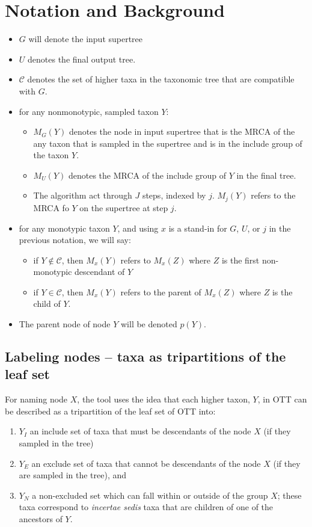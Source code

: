 \documentclass[english]{article}
\newcommand{\parent}[1]{p(#1)}
\newcommand{\tripartition}[1]{\left[{#1}_I \mid {#1}_E \updownarrow {#1}_N\right]}
\newcommand{\incsed}[0]{{\em incertae sedis}\xspace}
\begin{document}
\section{Notation and Background}
\begin{itemize}
    \item $G$ will denote the input supertree
    \item $U$  denotes the final output tree.
    \item $\mathcal{C}$ denotes the set of higher taxa in the taxonomic tree
        that are compatible with $G$.
    \item for any nonmonotypic, sampled taxon $Y$:
    \begin{itemize}
        \item $M_G(Y)$ denotes the node in input supertree that is the MRCA of
            the any taxon that is sampled in the supertree and is in the
            include group of the taxon $Y$.
        \item $M_U(Y)$ denotes the MRCA of the include group of $Y$ in the final tree.
        \item The algorithm act through $J$ steps, indexed by $j$.
            $M_j(Y)$ refers to the MRCA fo $Y$ on the supertree at step $j$.
    \end{itemize}
    \item for any monotypic taxon $Y$, and using $x$ is a stand-in for $G$, $U$, or $j$ in the previous notation, we will say:
    \begin{itemize}
        \item if $Y\notin\mathcal{C}$, then $M_x(Y)$ refers
            to $M_x(Z)$ where $Z$ is the first non-monotypic descendant of $Y$
        \item if $Y \in \mathcal{C}$, then $M_x(Y)$ refers
            to the parent of $M_x(Z)$ where $Z$ is the child of $Y$.
    \end{itemize}
    \item The parent node of node $Y$ will be denoted $\parent{Y}$.
\end{itemize}

\subsection{Labeling nodes -- taxa as tripartitions of the leaf set}
For naming node $X$, the tool uses the idea that each higher taxon, $Y$, in OTT can
    be described as a tripartition of the leaf set of OTT into:
\begin{enumerate}
    \item $Y_I$ an include set of taxa that must be descendants of the node $X$ (if they sampled in the tree)
    \item $Y_E$ an exclude set of taxa that cannot be descendants of the node $X$ (if they are sampled in the tree), and 
    \item $Y_N$ a non-excluded set which can fall within or outside of the group $X$; these taxa
    correspond to \incsed taxa that are children of one of the ancestors of $Y$.
\end{enumerate}
\end{document}
